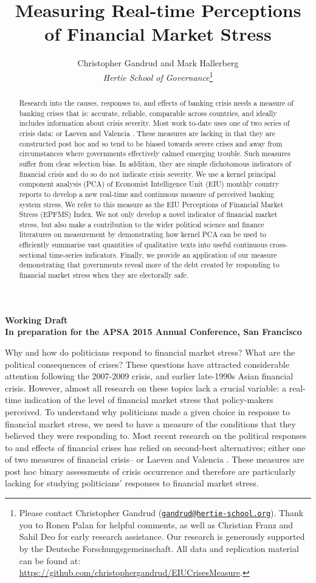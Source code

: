 \documentclass[]{article}
\title{Measuring Real-time Perceptions of Financial Market Stress}
\author{Christopher Gandrud and Mark Hallerberg \\ \emph{Hertie School of Governance}\footnote{Please contact Christopher Gandrud
(\href{mailto:gandrud@hertie-school.org}{\nolinkurl{gandrud@hertie-school.org}}).
Thank you to Ronen Palan for helpful comments, as well as Christian Franz and Sahil Deo for early research assistance. Our research is generously supported by the Deutsche Forschungsgemeinschaft. All data and replication material can be found at:
\url{https://github.com/christophergandrud/EIUCrisesMeasure}.}}
\begin{document}
\maketitle

\begin{center}
    \textbf{Working Draft \\ In preparation for the APSA 2015 Annual Conference, San Francisco}
\end{center}

\begin{abstract}
    Research into the causes, responses to, and effects of banking crisis needs a measure of banking crises that is: accurate, reliable, comparable across countries, and ideally includes information about crisis severity. Most work to-date uses one of two series of crisis data: \cite{Reinhart2009,ReinhartRog2010} or Laeven and Valencia \citeyearpar[and their predecessors]{laeven2013}. These measures are lacking in that they are constructed post hoc and so tend to be biased towards severe crises and away from circumstances where governments effectively calmed emerging trouble. Such measures suffer from clear selection bias. In addition, they are simple dichotomous indicators of financial crisis and do so do not indicate crisis severity. We use a kernel principal component analysis (PCA) of Economist Intelligence Unit (EIU) monthly country reports to develop a new real-time and continuous measure of perceived banking system stress. We refer to this measure as the EIU Perceptions of Financial Market Stress (EPFMS) Index. We not only develop a novel indicator of financial market stress, but also make a contribution to the wider political science and finance literatures on measurement by demonstrating how kernel PCA can be used to efficiently summarise vast quantities of qualitative texts into useful continuous cross-sectional time-series indicators. Finally, we provide an application of our measure demonstrating that governments reveal more of the debt created by responding to financial market stress when they are electorally safe.
\end{abstract}

Why and how do politicians respond to financial market stress? What are the political consequences of crises? These questions have attracted considerable attention following the
2007-2009 crisis, and earlier late-1990s Asian financial crisis. However, almost all research on these topics lack a crucial variable: a real-time indication of the level of financial
market stress that policy-makers perceived. To understand why politicians made a given choice in response to financial market stress, we need to have a measure of the conditions that they believed they were responding to. Most recent research on the political responses to and effects of financial crises has relied on second-best alternatives; either one of two measures of financial crisis--\cite{Reinhart2009,ReinhartRog2010} or Laeven and Valencia \citeyearpar[and their predecessors]{laeven2013}. These measures are post hoc binary assessments of crisis occurrence and therefore are particularly lacking for studying politicians' responses to financial market stress.
\end{document}
